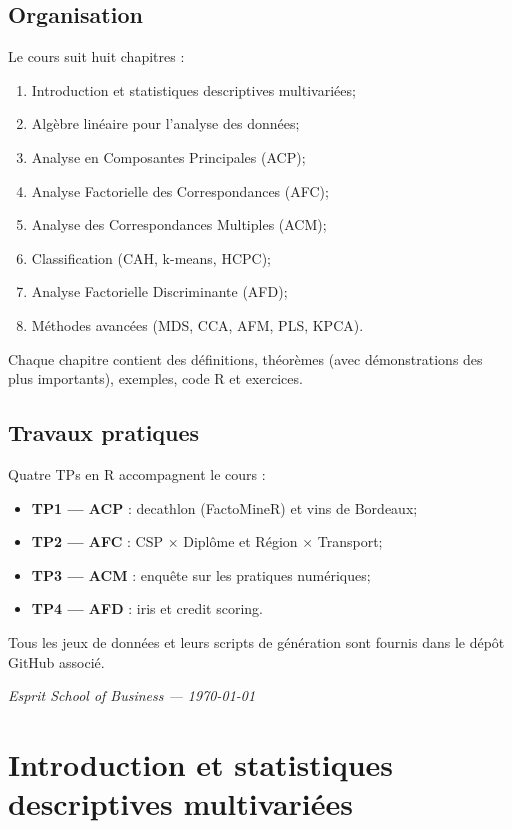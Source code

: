 \documentclass[11pt, a4paper, openany]{book}
\theoremstyle{plain}
\theoremstyle{definition}
\theoremstyle{remark}
\newcommand{\1}{\mathds{1}}
\begin{document}
\section*{Organisation}
Le cours suit huit chapitres :
\begin{enumerate}
  \item Introduction et statistiques descriptives multivariées;
  \item Algèbre linéaire pour l'analyse des données;
  \item Analyse en Composantes Principales (ACP);
  \item Analyse Factorielle des Correspondances (AFC);
  \item Analyse des Correspondances Multiples (ACM);
  \item Classification (CAH, k-means, HCPC);
  \item Analyse Factorielle Discriminante (AFD);
  \item Méthodes avancées (MDS, CCA, AFM, PLS, KPCA).
\end{enumerate}
Chaque chapitre contient des définitions, théorèmes (avec démonstrations
des plus importants), exemples, code R et exercices.

\section*{Travaux pratiques}
Quatre TPs en R accompagnent le cours :
\begin{itemize}
  \item \textbf{TP1 — ACP} : decathlon (FactoMineR) et vins de Bordeaux;
  \item \textbf{TP2 — AFC} : CSP × Diplôme et Région × Transport;
  \item \textbf{TP3 — ACM} : enquête sur les pratiques numériques;
  \item \textbf{TP4 — AFD} : iris et credit scoring.
\end{itemize}
Tous les jeux de données et leurs scripts de génération sont fournis dans
le dépôt GitHub associé.

\vspace{2cm}
\begin{flushright}
\textit{Esprit School of Business --- \today}
\end{flushright}

\tableofcontents

\mainmatter

\chapter{Introduction et statistiques descriptives multivariées}
\end{document}
